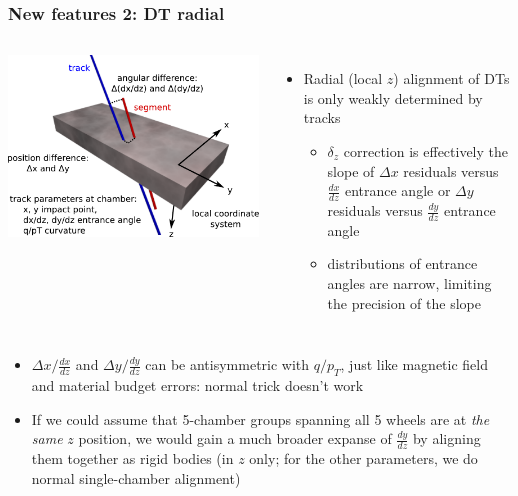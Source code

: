\documentclass[compress]{beamer}
\begin{document}
\begin{frame}
\frametitle{New features 2: DT radial}

\begin{columns}
\includegraphics[width=\linewidth]{dt_coordinates.pdf}

\begin{itemize}
\item Radial (local $z$) alignment of DTs is only weakly determined by tracks
\begin{itemize}
\item $\delta_z$ correction is effectively the slope of $\Delta x$
  residuals versus $\frac{dx}{dz}$ entrance angle or $\Delta y$
  residuals versus $\frac{dy}{dz}$ entrance angle
\item distributions of entrance angles are narrow, limiting the precision of the slope
\end{itemize}
\end{itemize}
\end{columns}

\begin{itemize}
\item $\Delta x / \frac{dx}{dz}$ and $\Delta y / \frac{dy}{dz}$ can be antisymmetric with $q/p_T$, just like magnetic field and material budget errors: normal trick doesn't work
\item If we could assume that 5-chamber groups spanning all 5 wheels
  are at {\it the same} $z$ position, we would gain a much broader
  expanse of $\frac{dy}{dz}$ by aligning them together as rigid bodies
  (in $z$ only; for the other parameters, we do normal single-chamber alignment)
\end{itemize}
\end{frame}
\end{document}
